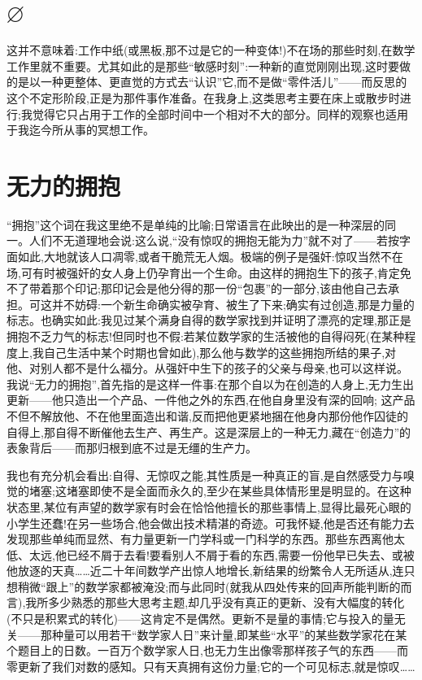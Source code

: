 \section{$\varnothing$}

这并不意味着:工作中纸(或黑板,那不过是它的一种变体!)不在场的那些时刻,在数学工作里就不重要。尤其如此的是那些“敏感时刻”:一种新的直觉刚刚出现,这时要做的是以一种更整体、更直觉的方式去“认识”它,而不是做“零件活儿”——而反思的这个不定形阶段,正是为那件事作准备。在我身上,这类思考主要在床上或散步时进行;我觉得它只占用于工作的全部时间中一个相对不大的部分。同样的观察也适用于我迄今所从事的冥想工作。

\section{无力的拥抱}

“拥抱”这个词在我这里绝不是单纯的比喻;日常语言在此映出的是一种深层的同一。人们不无道理地会说:这么说,“没有惊叹的拥抱无能为力”就不对了——若按字面如此,大地就该人口凋零,或者干脆荒无人烟。极端的例子是强奸:惊叹当然不在场,可有时被强奸的女人身上仍孕育出一个生命。由这样的拥抱生下的孩子,肯定免不了带着那个印记;那印记会是他分得的那一份“包裹”的一部分,该由他自己去承担。可这并不妨碍:一个新生命确实被孕育、被生了下来;确实有过创造,那是力量的标志。也确实如此:我见过某个满身自得的数学家找到并证明了漂亮的定理,那正是拥抱不乏力气的标志!但同时也不假:若某位数学家的生活被他的自得闷死(在某种程度上,我自己生活中某个时期也曾如此),那么他与数学的这些拥抱所结的果子,对他、对别人都不是什么福分。从强奸中生下的孩子的父亲与母亲,也可以这样说。我说“无力的拥抱”,首先指的是这样一件事:在那个自以为在创造的人身上,无力生出更新——他只造出一个产品、一件他之外的东西,在他自身里没有深的回响;
这产品不但不解放他、不在他里面造出和谐,反而把他更紧地捆在他身内那份他作囚徒的自得上,那自得不断催他去生产、再生产。这是深层上的一种无力,藏在“创造力”的表象背后——而那归根到底不过是无缰的生产力。

我也有充分机会看出:自得、无惊叹之能,其性质是一种真正的盲,是自然感受力与嗅觉的堵塞;这堵塞即使不是全面而永久的,至少在某些具体情形里是明显的。在这种状态里,某位有声望的数学家有时会在恰恰他擅长的那些事情上,显得比最死心眼的小学生还蠢!在另一些场合,他会做出技术精湛的奇迹。可我怀疑,他是否还有能力去发现那些单纯而显然、有力量更新一门学科或一门科学的东西。那些东西离他太低、太远,他已经不屑于去看!要看别人不屑于看的东西,需要一份他早已失去、或被他放逐的天真……近二十年间数学产出惊人地增长,新结果的纷繁令人无所适从,连只想稍微“跟上”的数学家都被淹没;而与此同时(就我从四处传来的回声所能判断的而言),我所多少熟悉的那些大思考主题,却几乎没有真正的更新、没有大幅度的转化(不只是积累式的转化)——这肯定不是偶然。更新不是量的事情;它与投入的量无关——那种量可以用若干“数学家人日”来计量,即某些“水平”的某些数学家花在某个题目上的日数。一百万个数学家人日,也无力生出像零那样孩子气的东西——而零更新了我们对数的感知。只有天真拥有这份力量;它的一个可见标志,就是惊叹……

